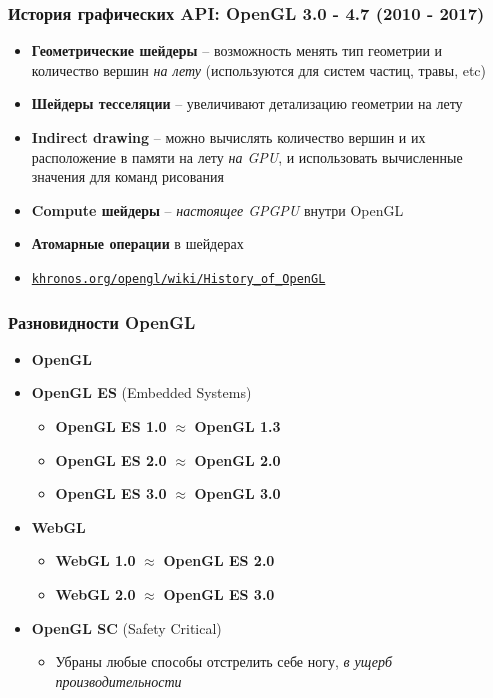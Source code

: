 \documentclass[10pt]{beamer}
\begin{document}
\begin{frame}
\frametitle{История графических API: OpenGL 3.0 - 4.7 (2010 - 2017)}
\begin{itemize}
\item \textbf{Геометрические шейдеры} -- возможность менять тип геометрии и количество вершин \textit{на лету} (используются для систем частиц, травы, etc)
\item \textbf{Шейдеры тесселяции} -- увеличивают детализацию геометрии на лету
\item \textbf{Indirect drawing} -- можно вычислять количество вершин и их расположение в памяти на лету \textit{на GPU}, и использовать вычисленные значения для команд рисования
\item \textbf{Compute шейдеры} -- \textit{настоящее GPGPU} внутри OpenGL
\item \textbf{Атомарные операции} в шейдерах
\item \href{https://khronos.org/opengl/wiki/History_of_OpenGL}{\nolinkurl{khronos.org/opengl/wiki/History\_of\_OpenGL}}
\end{itemize}
\end{frame}

\begin{frame}
\frametitle{Разновидности OpenGL}
\begin{itemize}
\item \textbf{OpenGL}
\pause
\item \textbf{OpenGL ES} (Embedded Systems)
\begin{itemize}
\item \textbf{OpenGL ES 1.0} $\approx$ \textbf{OpenGL 1.3}
\item \textbf{OpenGL ES 2.0} $\approx$ \textbf{OpenGL 2.0}
\item \textbf{OpenGL ES 3.0} $\approx$ \textbf{OpenGL 3.0}
\end{itemize}
\pause
\item \textbf{WebGL}
\begin{itemize}
\item \textbf{WebGL 1.0} $\approx$ \textbf{OpenGL ES 2.0}
\item \textbf{WebGL 2.0} $\approx$ \textbf{OpenGL ES 3.0}
\end{itemize}
\pause
\item \textbf{OpenGL SC} (Safety Critical)
\begin{itemize}
\item Убраны любые способы отстрелить себе ногу, \textit{в ущерб производительности}
\end{itemize}
\end{itemize}
\end{frame}
\end{document}
